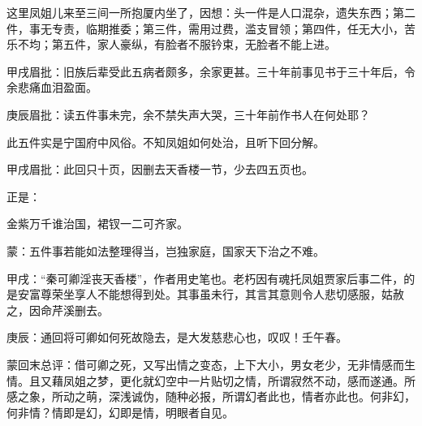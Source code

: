 \begin{parag}
    这里凤姐儿来至三间一所抱厦内坐了，因想：头一件是人口混杂，遗失东西；第二件，事无专责，临期推委；第三件，需用过费，滥支冒领；第四件，任无大小，苦乐不均；第五件，家人豪纵，有脸者不服钤束，无脸者不能上进。\begin{note}甲戌眉批：旧族后辈受此五病者颇多，余家更甚。三十年前事见书于三十年后，令余悲痛血泪盈面。\end{note}\begin{note}庚辰眉批：读五件事未完，余不禁失声大哭，三十年前作书人在何处耶？\end{note}此五件实是宁国府中风俗。不知凤姐如何处治，且听下回分解。\begin{note}甲戌眉批：此回只十页，因删去天香楼一节，少去四五页也。\end{note}
\end{parag}


\begin{parag}
    正是：
\end{parag}


\begin{poem}
    \begin{pl} 金紫万千谁治国，裙钗一二可齐家。\end{pl}
    \begin{note}蒙：五件事若能如法整理得当，岂独家庭，国家天下治之不难。\end{note}
\end{poem}


\begin{parag}
    \begin{note}甲戌：“秦可卿淫丧天香楼”，作者用史笔也。老朽因有魂托凤姐贾家后事二件，的是安富尊荣坐享人不能想得到处。其事虽未行，其言其意则令人悲切感服，姑赦之，因命芹溪删去。\end{note}
\end{parag}


\begin{parag}
    \begin{note}庚辰：通回将可卿如何死故隐去，是大发慈悲心也，叹叹！壬午春。\end{note}
\end{parag}


\begin{parag}
    \begin{note}蒙回末总评：借可卿之死，又写出情之变态，上下大小，男女老少，无非情感而生情。且又藉凤姐之梦，更化就幻空中一片贴切之情，所谓寂然不动，感而遂通。所感之象，所动之萌，深浅诚伪，随种必报，所谓幻者此也，情者亦此也。何非幻，何非情？情即是幻，幻即是情，明眼者自见。\end{note}
\end{parag}

